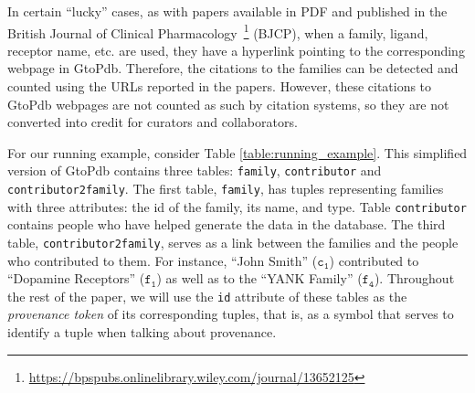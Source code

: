 In certain ``lucky'' cases, as with papers available in PDF and published in the British Journal of Clinical Pharmacology~\footnote{\url{https://bpspubs.onlinelibrary.wiley.com/journal/13652125}} (BJCP), when a  family, ligand, receptor name, etc. are used, they have a hyperlink pointing to the corresponding webpage in GtoPdb. Therefore, the citations to the families can be detected and counted using the URLs reported in the papers.
However, these citations to GtoPdb webpages are not counted as such by citation systems, so they are not converted into credit for curators and collaborators. 

For our running example, consider Table \ref{table:running_example}. This simplified version of GtoPdb contains three tables: \texttt{family}, \texttt{contributor} and \texttt{contributor2family}.
The first table, \texttt{family}, has tuples representing families with three attributes: the id of the family, its name, and type. 
Table \texttt{contributor} contains people who have helped generate the data in the database.
The third table, \texttt{contributor2family}, serves as a link between the families and the people who contributed to them.
For instance, ``John Smith'' ($\mathtt{c_1}$) contributed to ``Dopamine Receptors'' ($\mathtt{f_1}$) as well as to the ``YANK Family'' ($\mathtt{f_4}$). Throughout the rest of the paper, we will use the \texttt{id} attribute of these tables as the \emph{provenance token} of its corresponding tuples, that is, as a symbol that serves to identify a tuple when talking about provenance.

